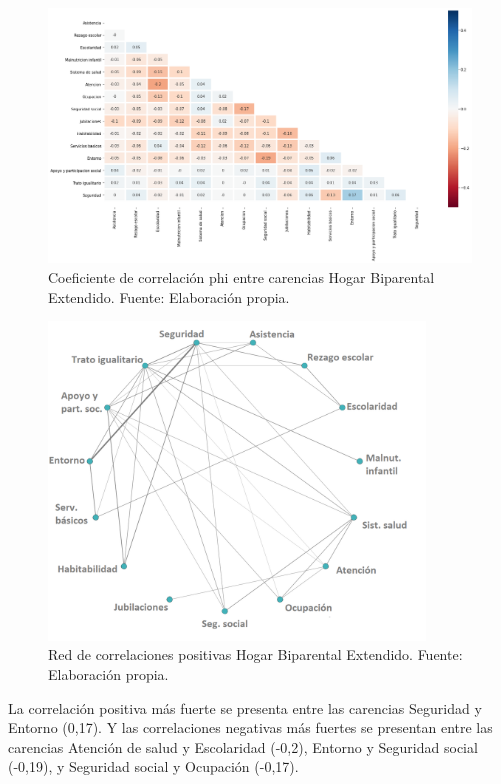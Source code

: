 \documentclass[12pt,letterpaper,spanish]{article}
\begin{document}
\begin{figure}[H]
    \centering
    \includegraphics[width=\textwidth]{Heatmaps/Heatmap_pearson_car_biex.png}
    \caption{Coeficiente de correlación phi entre carencias Hogar Biparental Extendido. Fuente: Elaboración propia.}
    \label{HMBiex}
\end{figure}

\begin{figure}[H]
  \centering
    \includegraphics[width=10cm]{Grafos/grafo_biex_pos.png}
    \caption{Red de correlaciones positivas Hogar Biparental Extendido. Fuente: Elaboración propia.}
    \label{RedBiexpos}
\end{figure}

La correlación positiva más fuerte se presenta entre las carencias Seguridad y Entorno (0,17). Y las correlaciones negativas más fuertes se presentan entre las carencias Atención de salud y Escolaridad (-0,2), Entorno y Seguridad social (-0,19), y Seguridad social y Ocupación (-0,17).
\end{document}
